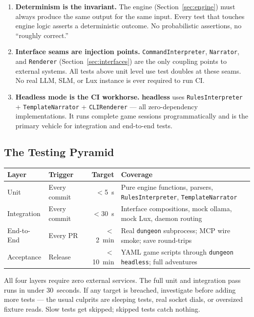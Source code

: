 \documentclass[a4paper,10pt]{article}
\newcommand{\iface}[1]{\texttt{#1}}
\newcommand{\cmd}[1]{\texttt{#1}}
\newcommand{\mode}[1]{\textbf{#1}}
\begin{document}
\begin{enumerate}[label=\textbf{P\arabic*}.]
  \item \textbf{Determinism is the invariant.}
    The engine (Section~\ref{sec:engine}) must always produce the
    same output for the same input.  Every test that touches engine
    logic asserts a deterministic outcome.  No probabilistic
    assertions, no ``roughly correct.''
  \item \textbf{Interface seams are injection points.}
    \iface{CommandInterpreter}, \iface{Narrator}, and
    \iface{Renderer} (Section~\ref{sec:interfaces}) are the only
    coupling points to external systems.  All tests above unit level
    use test doubles at these seams.  No real LLM, SLM, or Lux
    instance is ever required to run CI.
  \item \textbf{Headless mode is the CI workhorse.}
    \mode{headless} uses \texttt{RulesInterpreter} +
    \texttt{TemplateNarrator} + \texttt{CLIRenderer} — all
    zero-dependency implementations.  It runs complete game sessions
    programmatically and is the primary vehicle for integration and
    end-to-end tests.
\end{enumerate}

\subsection{The Testing Pyramid}

\begin{center}
\begin{tabular}{llrp{5.5cm}}
\toprule
\textbf{Layer} & \textbf{Trigger} & \textbf{Target} & \textbf{Coverage} \\
\midrule
Unit           & Every commit & $<$5~s   & Pure engine functions, parsers, \texttt{RulesInterpreter}, \texttt{TemplateNarrator} \\
Integration    & Every commit & $<$30~s  & Interface compositions, mock ollama, mock Lux, daemon routing \\
End-to-End     & Every PR     & $<$2~min & Real \cmd{dungeon} subprocess; MCP wire smoke; save round-trips \\
Acceptance     & Release      & $<$10~min & YAML game scripts through \cmd{dungeon headless}; full adventures \\
\bottomrule
\end{tabular}
\end{center}

All four layers require zero external services.  The full unit and
integration pass runs in under 30~seconds.  If any target is
breached, investigate before adding more tests --- the usual
culprits are sleeping tests, real socket dials, or oversized
fixture reads.  Slow tests get skipped; skipped tests catch nothing.
\end{document}

